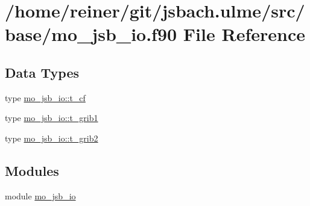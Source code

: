 \hypertarget{mo__jsb__io_8f90}{}\section{/home/reiner/git/jsbach.ulme/src/base/mo\+\_\+jsb\+\_\+io.f90 File Reference}
\label{mo__jsb__io_8f90}
\subsection*{Data Types}
\begin{DoxyCompactItemize}
\item 
type \hyperlink{structmo__jsb__io_1_1t__cf}{mo\+\_\+jsb\+\_\+io\+::t\+\_\+cf}
\item 
type \hyperlink{structmo__jsb__io_1_1t__grib1}{mo\+\_\+jsb\+\_\+io\+::t\+\_\+grib1}
\item 
type \hyperlink{structmo__jsb__io_1_1t__grib2}{mo\+\_\+jsb\+\_\+io\+::t\+\_\+grib2}
\end{DoxyCompactItemize}
\subsection*{Modules}
\begin{DoxyCompactItemize}
\item 
module \hyperlink{namespacemo__jsb__io}{mo\+\_\+jsb\+\_\+io}
\end{DoxyCompactItemize}
